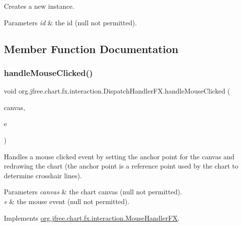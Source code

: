 Creates a new instance.


\begin{DoxyParams}{Parameters}
{\em id} & the id ({\ttfamily null} not permitted). \\
\hline
\end{DoxyParams}


\subsection{Member Function Documentation}
\mbox{\label{classorg_1_1jfree_1_1chart_1_1fx_1_1interaction_1_1_dispatch_handler_f_x_a9a58cb60ccd2dba2c76b19f91fe7d55a}} 
\subsubsection{\texorpdfstring{handle\+Mouse\+Clicked()}{handleMouseClicked()}}
{\footnotesize\ttfamily void org.\+jfree.\+chart.\+fx.\+interaction.\+Dispatch\+Handler\+F\+X.\+handle\+Mouse\+Clicked (\begin{DoxyParamCaption}\item[{\mbox{\hyperlink{classorg_1_1jfree_1_1chart_1_1fx_1_1_chart_canvas}{Chart\+Canvas}}}]{canvas,  }\item[{Mouse\+Event}]{e }\end{DoxyParamCaption})}

Handles a mouse clicked event by setting the anchor point for the canvas and redrawing the chart (the anchor point is a reference point used by the chart to determine crosshair lines).


\begin{DoxyParams}{Parameters}
{\em canvas} & the chart canvas ({\ttfamily null} not permitted). \\
\hline
{\em e} & the mouse event ({\ttfamily null} not permitted). \\
\hline
\end{DoxyParams}


Implements \mbox{\hyperlink{interfaceorg_1_1jfree_1_1chart_1_1fx_1_1interaction_1_1_mouse_handler_f_x_aa1761ee25681cfee7de718c887d4ae5e}{org.\+jfree.\+chart.\+fx.\+interaction.\+Mouse\+Handler\+FX}}.

